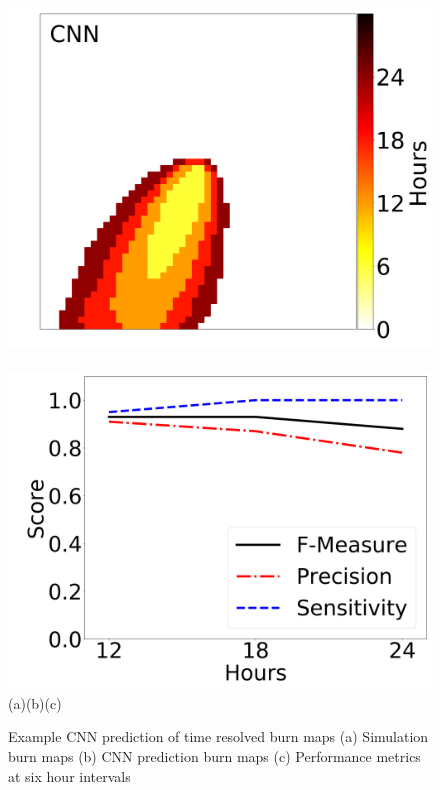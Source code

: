\documentclass[smallcondensed]{svjour3}     %
\begin{document}
\begin{figure}[htbp]
	\includegraphics[height=0.16\textheight]{timeAnalysis_network4.png}
	~
	\includegraphics[height=0.16\textheight]{timeAnalysis_fmeasure4.png}
	\\
\hspace{0.027\textwidth}(a)\hspace{0.25\textwidth}(b)\hspace{0.31\textwidth}(c)
\caption{Example CNN prediction of time resolved burn maps (a) Simulation burn maps (b) CNN prediction burn maps (c) Performance metrics at six hour intervals}
\label{fig:timeAnalysis}       %
\end{figure}
\end{document}
